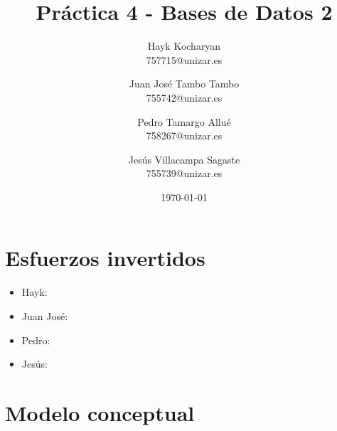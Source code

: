 \documentclass[11pt,a4paper]{article}
\begin{document}
\begin{titlepage}
	\title{{\Huge \textbf{Práctica 4 - Bases de Datos 2}}}
	\author{
	  Hayk Kocharyan\\
	  757715@unizar.es
	  \and
	  Juan José Tambo Tambo\\
	  755742@unizar.es
	  \and
	  Pedro Tamargo Allué\\
	  758267@unizar.es
	  \and
	  Jesús Villacampa Sagaste\\
	  755739@unizar.es
	}
	\date{\today}
	
	\clearpage\maketitle
	\thispagestyle{empty}
	\tableofcontents
	\listoffigures
\end{titlepage}

\section{Esfuerzos invertidos}

\begin{itemize}
\item Hayk:
\item Juan José:
\item Pedro:
\item Jesús:
\end{itemize}

\section{Modelo conceptual}
\end{document}
